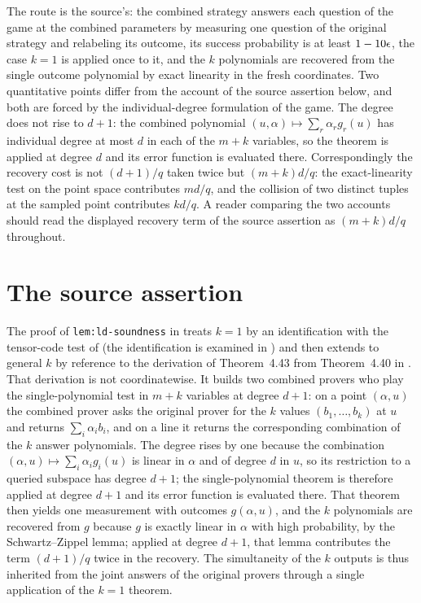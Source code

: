 \documentclass[11pt]{article}
\begin{document}
The route is the source's: the combined strategy answers each question of the
game at the combined parameters by measuring one question of the original
strategy and relabeling its outcome, its success probability is at least
$1 - 10\epsilon$, the case $k = 1$ is applied once to it, and the $k$ polynomials
are recovered from the single outcome polynomial by exact linearity in the
fresh coordinates.  Two quantitative points differ from the account of the
source assertion below, and both are forced by the individual-degree
formulation of the game.  The degree does not rise to $d + 1$: the combined
polynomial $(u,\alpha) \mapsto \sum_r \alpha_r g_r(u)$ has individual degree
at most $d$ in each of the $m + k$ variables, so the theorem is applied at
degree $d$ and its error function is evaluated there.  Correspondingly the
recovery cost is not $(d+1)/q$ taken twice but $(m+k)d/q$: the exact-linearity
test on the point space contributes $md/q$, and the collision of two distinct
tuples at the sampled point contributes $kd/q$.  A reader comparing the two
accounts should read the displayed recovery term of the source assertion as
$(m+k)d/q$ throughout.

\section{The source assertion}

The proof of \texttt{lem:ld-soundness} in
\cite[lines~413--458]{Ji2020MIPStar} treats $k = 1$ by an identification
with the tensor-code test of \cite{Ji2021Quantum} (the identification is
examined in ) and
then extends to general $k$ by reference to the derivation of Theorem~4.43
from Theorem~4.40 in \cite[lines~1409--1503]{Natarajan2018NEEXP}.  That
derivation is not coordinatewise.  It builds two combined provers who play
the single-polynomial test in $m + k$ variables at degree $d + 1$: on a
point $(\alpha, u)$ the combined prover asks the original prover for the $k$
values $(b_1,\dots,b_k)$ at $u$ and returns $\sum_i \alpha_i b_i$, and on a
line it returns the corresponding combination of the $k$ answer polynomials.
The degree rises by one because the combination
$(\alpha, u) \mapsto \sum_i \alpha_i g_i(u)$ is linear in $\alpha$ and of
degree $d$ in $u$, so its restriction to a queried subspace has degree
$d + 1$; the single-polynomial theorem is therefore applied at degree $d + 1$
and its error function is evaluated there.  That theorem then yields one
measurement with outcomes $g(\alpha,u)$, and the $k$ polynomials are
recovered from $g$ because $g$ is exactly linear in $\alpha$ with high
probability, by the Schwartz--Zippel lemma; applied at degree $d + 1$, that
lemma contributes the term $(d+1)/q$ twice in the recovery.  The
simultaneity of the $k$ outputs is thus inherited from the joint answers of
the original provers through a single application of the $k = 1$ theorem.
\end{document}
